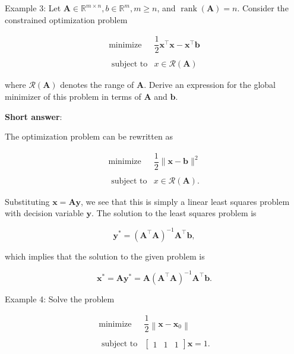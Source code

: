 Example 3: Let \(\boldsymbol{A} \in \mathbb{R}^{m \times n}, b \in \mathbb{R}^{m}, m \geq n\), and \(\operatorname{rank}(\boldsymbol{A})=n\). Consider the constrained optimization problem

\[
	\begin{array}{rl}
		\operatorname{minimize} & \dfrac{1}{2} \boldsymbol{x}^{\top} \boldsymbol{x}-\boldsymbol{x}^{\top} \boldsymbol{b} \\
		& \\
		\text { subject to} & x \in \mathcal{R}(\boldsymbol{A})
	\end{array}
\]

where \(\mathcal{R}(\boldsymbol{A})\) denotes the range of \(\boldsymbol{A}\). Derive an expression for the global minimizer of this problem in terms of \(\boldsymbol{A}\) and \(\boldsymbol{b}\).

\textbf{Short answer}:

The optimization problem can be rewritten as

\[
	\begin{array}{rl}
		\operatorname{minimize} & \dfrac{1}{2}\|\boldsymbol{x}-\boldsymbol{b}\|^{2} \\
		& \\
		\text { subject to} & x \in \mathcal{R}(\boldsymbol{A}) .
	\end{array}
\]

Substituting \(\boldsymbol{x}=\boldsymbol{A} \boldsymbol{y}\), we see that this is simply a linear least squares problem with decision variable \(\boldsymbol{y}\). The solution to the least squares problem is

\[
	\boldsymbol{y}^{*}=\left(\boldsymbol{A}^{\top} \boldsymbol{A}\right)^{-1} \boldsymbol{A}^{\top} \boldsymbol{b},
\]

which implies that the solution to the given problem is

\[
	\boldsymbol{x}^{*}=\boldsymbol{A} \boldsymbol{y}^{*}=\boldsymbol{A}\left(\boldsymbol{A}^{\top} \boldsymbol{A}\right)^{-1} \boldsymbol{A}^{\top} \boldsymbol{b}.
\]

Example 4: Solve the problem

\[
	\begin{array}{rl}
		\operatorname{ minimize} & \dfrac{1}{2}\left\|\boldsymbol{x}-\boldsymbol{x}_{0}\right\| \\
		& \\
		\text { subject to} & {\left[\begin{array}{lll}
				1 & 1 & 1
			\end{array}\right] \boldsymbol{x}=1 }.
	\end{array}
\]


